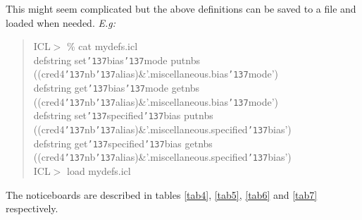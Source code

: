 \documentclass[a4paper]{book}
\renewcommand{\_}{{\tt\char'137}}
\begin{document}
This might seem complicated but the above definitions can be saved to a
file and loaded when needed. {\em E.g:}

\begin{quote}
 ICL$>$ \% cat mydefs.icl \\
 defstring set\_bias\_mode putnbs ((cred4\_nb\_alias)\&'.miscellaneous.bias\_mode') \\
 defstring get\_bias\_mode getnbs ((cred4\_nb\_alias)\&'.miscellaneous.bias\_mode') \\
 defstring set\_specified\_bias putnbs ((cred4\_nb\_alias)\&'.miscellaneous.specified\_bias') \\
 defstring get\_specified\_bias getnbs ((cred4\_nb\_alias)\&'.miscellaneous.specified\_bias') \\
 ICL$>$ load mydefs.icl
\end{quote}

The noticeboards are described in tables \ref{tab4}, \ref{tab5}, \ref{tab6} and \ref{tab7} respectively. 
\end{document}
